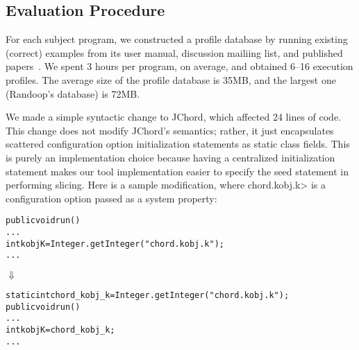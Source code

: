 \subsection{Evaluation Procedure}

For each subject program, we constructed a profile database
by running existing (correct) examples from its user manual, discussion
mailiing list, and published papers~\cite{PachecoLET2007, Beschastnikh:2011, Rabkin:2011:PPC}.
We spent 3 hours per program, on average, and obtained 6--16 execution profiles.
The average size of the profile database is 35MB, and the largest one (Randoop's
database) is 72MB.



We made a simple syntactic change to JChord, which affected 24 
lines of code. This change
does not modify JChord's semantics; rather, it just encapsulates
scattered configuration option initialization statements 
as static class fields. This is purely an implementation
choice because having a centralized initialization statement
makes our tool implementation easier to specify the seed statement
in performing slicing. Here is a sample modification, where 
\<chord.kobj.k> 
is a configuration option
passed as a system property:


\begin{CodeOut}
\begin{alltt}
public void run() \ttlcb
  ...
  int kobjK = Integer.getInteger("chord.kobj.k");
  ...
\ttrcb
\end{alltt}
\end{CodeOut}
\vspace{-4mm}
\hspace{20mm}$\Downarrow$ 
\begin{CodeOut}
\begin{alltt}
static int chord\_kobj\_k = Integer.getInteger("chord.kobj.k");
public void run() \ttlcb
  ...
  int kobjK = chord\_kobj\_k; 
  ...
\ttrcb
\end{alltt}
\end{CodeOut}





